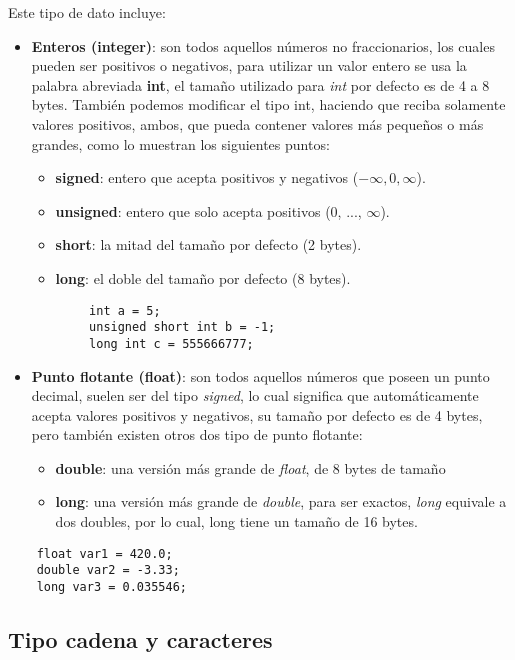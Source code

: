 Este tipo de dato incluye:
\begin{itemize}
    \item \textbf{Enteros (integer)}: son todos aquellos números no fraccionarios, los cuales pueden ser positivos o negativos, para utilizar un valor entero se usa la palabra abreviada \textbf{int}, el tamaño utilizado para \textit{int} por defecto es de 4 a 8 bytes. También podemos modificar el tipo int, haciendo que reciba solamente valores positivos, ambos, que pueda contener valores más pequeños o más grandes, como lo muestran los siguientes puntos:
    \begin{itemize}
        \item \textbf{signed}: entero que acepta positivos y negativos ($-\infty, 0, \infty$).
        \item \textbf{unsigned}: entero que solo acepta positivos (0, ..., $\infty$).
        \item \textbf{short}: la mitad del tamaño por defecto (2 bytes).
        \item \textbf{long}: el doble del tamaño por defecto (8 bytes).
    \end{itemize}
    \begin{lstlisting}
        int a = 5;
        unsigned short int b = -1;
        long int c = 555666777;
    \end{lstlisting}
    \item \textbf{Punto flotante (float)}: son todos aquellos números que poseen un punto decimal, suelen ser del tipo \textit{signed}, lo cual significa que automáticamente acepta valores positivos y negativos, su tamaño por defecto es de 4 bytes, pero también existen otros dos tipo de punto flotante:
    \begin{itemize}
        \item \textbf{double}: una versión más grande de \textit{float}, de 8 bytes de tamaño
        \item \textbf{long}: una versión más grande de \textit{double}, para ser exactos, \textit{long} equivale a dos doubles, por lo cual, long tiene un tamaño de 16 bytes.
    \end{itemize}
\end{itemize}
\begin{lstlisting}
    float var1 = 420.0;
    double var2 = -3.33;
    long var3 = 0.035546;
\end{lstlisting}


\subsection{Tipo cadena y caracteres}

